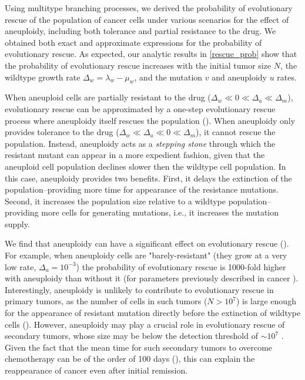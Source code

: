 \documentclass[12pt]{extarticle}
\begin{document}
Using multitype branching processes, we derived the probability of evolutionary rescue of the population of cancer cells under various scenarios for the effect of aneuploidy, including both tolerance and partial resistance to the drug.
We obtained both exact and approximate expressions for the probability of evolutionary rescue.
As expected, our analytic results in \cref{rescue_prob} show that the probability of evolutionary rescue increases with the initial tumor size $N$, the wildtype growth rate $\Delta_w=\lambda_w-\mu_w$, and the mutation $v$ and aneuploidy $u$ rates.

When aneuploid cells are partially resistant to the drug ($\Delta_w\ll0\ll\Delta_a\ll\Delta_m$), evolutionary rescue can be approximated by a one-step evolutionary rescue process where aneuploidy itself rescues the population (). 
When aneuploidy only provides tolerance to the drug ($\Delta_w\ll\Delta_a\ll0\ll\Delta_m$), it cannot rescue the population.
Instead, aneuploidy acts as a \emph{stepping stone} through which the resistant mutant can appear in a more expedient fashion, given that the aneuploid cell population declines slower then the wildtype cell population. In this case, aneuploidy provides two benefits. First, it delays the extinction of the population--providing more time for appearance of the resistance mutations. Second, it increases the population size relative to a wildtype population--providing more cells for generating mutations, i.e., it increases the mutation supply.

We find that aneuploidy can have a significant effect on evolutionary rescue (). For example, when aneuploidy cells are "barely-resistant" (they grow at a very low rate, $\Delta_a=10^{-3}$) the probability of evolutionary rescue is 1000-fold higher with aneuploidy than without it (for parameters previously described in cancer ).
Interestingly, aneuploidy is unlikely to contribute to evolutionary rescue in primary tumors, as the number of cells in such tumors ($N>10^7$) %
is large enough for the appearance of resistant mutation directly before the extinction of wildtype cells ().
However, aneuploidy may play a crucial role in evolutionary rescue of secondary tumors, whose size may be below the detection threshold of $\sim10^7$  \citep{bozic2013evolutionary}.
Given the fact that the mean time for such secondary tumors to overcome chemotherapy can be of the order of 100 days (), this can explain the reappearance of cancer even after initial remission.
\end{document}
